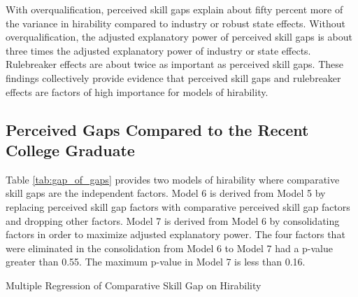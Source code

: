 \documentclass[review]{elsarticle}
\begin{document}
With overqualification, perceived skill gaps explain about fifty percent more of the variance in hirability compared to industry or robust state effects.
Without overqualification, the adjusted explanatory power of perceived skill gaps is about three times the adjusted explanatory power of industry or state effects.
Rulebreaker effects are about twice as important as perceived skill gaps.
These findings collectively provide evidence that perceived skill gaps and rulebreaker effects are factors of high importance for models of hirability.

\subsection{Perceived Gaps Compared to the Recent College Graduate}

Table \ref{tab:gap_of_gaps} provides two models of hirability where comparative skill gaps are the independent factors.
Model 6 is derived from Model 5 by replacing perceived skill gap factors with comparative perceived skill gap factors and dropping other factors.
Model 7 is derived from Model 6 by consolidating factors in order to maximize adjusted explanatory power.
The four factors that were eliminated in the consolidation from Model 6 to Model 7 had a p-value greater than 0.55.
The maximum p-value in Model 7 is less than 0.16.

\begin{table}
    \caption{Multiple Regression of Comparative Skill Gap on Hirability}
    \resizebox{\columnwidth}{!}{
        
    }
    \label{tab:gap_of_gaps}
\end{table}
\end{document}
